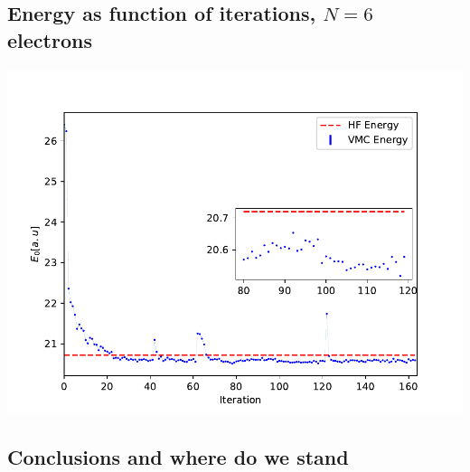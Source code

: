 \documentclass[%
oneside,                 %
final,                   %
10pt]{article}
\begin{document}
\vspace{6mm}




\subsection{Energy as function of iterations, $N=6$ electrons}

\paragraph{}


\vspace{6mm}

\centerline{\includegraphics[width=0.9\linewidth]{figures/figN6.pdf}}

\vspace{6mm}





\subsection{Conclusions and where do we stand}

\end{document}
